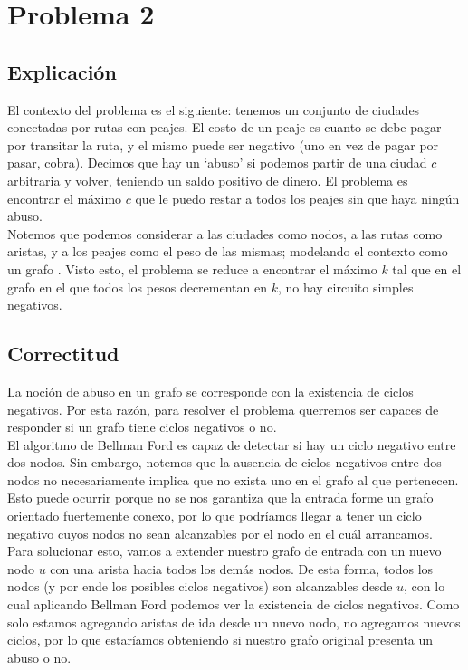 
\section{Problema 2}

\subsection{Explicación}

El contexto del problema es el siguiente: tenemos un conjunto de ciudades conectadas por rutas con peajes. El costo de un peaje es cuanto se debe pagar por transitar la ruta, y el mismo puede ser negativo (uno en vez de pagar por pasar, cobra). Decimos que hay un `abuso' si podemos partir de una ciudad $c$ arbitraria y volver, teniendo un saldo positivo de dinero. El problema es encontrar el máximo $c$ que le puedo restar a todos los peajes sin que haya ningún abuso. \\

Notemos que podemos considerar a las ciudades como nodos, a las rutas como aristas, y a los peajes como el peso de las mismas; modelando el contexto como un grafo . Visto esto, el problema se reduce a encontrar el máximo $k$ tal que en el grafo en el que todos los pesos decrementan en $k$, no hay circuito simples negativos. \\

\subsection{Correctitud}

La noción de abuso en un grafo se corresponde con la existencia de ciclos negativos. Por esta razón, para resolver el problema querremos ser capaces de responder si un grafo tiene ciclos negativos o no. \\

El algoritmo de Bellman Ford es capaz de detectar si hay un ciclo negativo entre dos nodos. Sin embargo, notemos que la ausencia de ciclos negativos entre dos nodos no necesariamente implica que no exista uno en el grafo al que pertenecen. Esto puede ocurrir porque no se nos garantiza que la entrada forme un grafo orientado fuertemente conexo, por lo que podríamos llegar a tener un ciclo negativo cuyos nodos no sean alcanzables por el nodo en el cuál arrancamos. \\

Para solucionar esto, vamos a extender nuestro grafo de entrada con un nuevo nodo $u$ con una arista hacia todos los demás nodos. De esta forma, todos los nodos (y por ende los posibles ciclos negativos) son alcanzables desde $u$, con lo cual aplicando Bellman Ford podemos ver la existencia de ciclos negativos. Como solo estamos agregando aristas de ida desde un nuevo nodo, no agregamos nuevos ciclos, por lo que estaríamos obteniendo si nuestro grafo original presenta un abuso o no. \\

